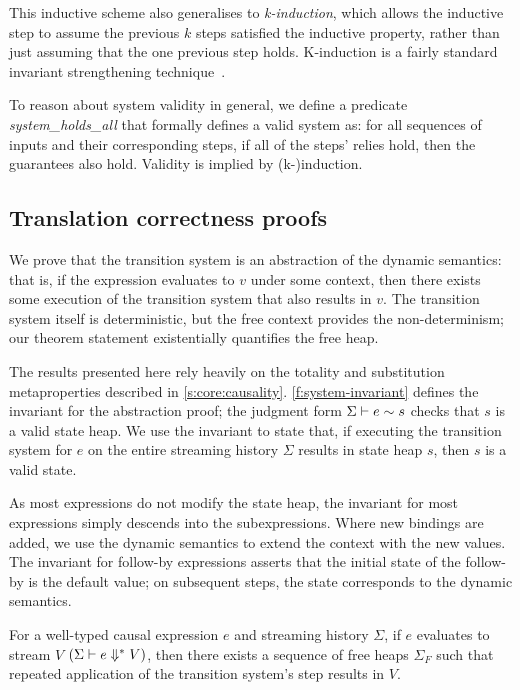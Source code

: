 This inductive scheme also generalises to \emph{k-induction}, which allows the inductive step to assume the previous $k$ steps satisfied the inductive property, rather than just assuming that the one previous step holds.
K-induction is a fairly standard invariant strengthening technique~\cite{hagen2008scaling,champion2016kind2,gacek2018jkind}.

To reason about system validity in general, we define a predicate \emph{system_holds_all} that formally defines a valid system as: for all sequences of inputs and their corresponding steps, if all of the steps' relies hold, then the guarantees also hold.
Validity is implied by (k-)induction.

\subsection{Translation correctness proofs}
\label{s:transition:proof}

We prove that the transition system is an abstraction of the dynamic semantics: that is, if the expression evaluates to $v$ under some context, then there exists some execution of the transition system that also results in $v$.
The transition system itself is deterministic, but the free context provides the non-determinism; our theorem  statement existentially quantifies the free heap.



The results presented here rely heavily on the totality and substitution metaproperties described in \autoref{s:core:causality}.
\autoref{f:system-invariant} defines the invariant for the abstraction proof; the judgment form $\Sigma \vdash e \sim s$ checks that $s$ is a valid state heap.
We use the invariant to state that, if executing the transition system for $e$ on the entire streaming history $\Sigma$ results in state heap $s$, then $s$ is a valid state.

As most expressions do not modify the state heap, the invariant for most expressions simply descends into the subexpressions.
Where new bindings are added, we use the dynamic semantics to extend the context with the new values.
The invariant for follow-by expressions asserts that the initial state of the follow-by is the default value; on subsequent steps, the state corresponds to the dynamic semantics.

\begin{theorem}
  For a well-typed causal expression $e$ and streaming history $\Sigma$, if $e$ evaluates to stream $V$ $(\Sigma \vdash e \Downarrow^{*} V)$, then there exists a sequence of free heaps $\Sigma_{F}$ such that repeated application of the transition system's step results in $V$.
\end{theorem}

